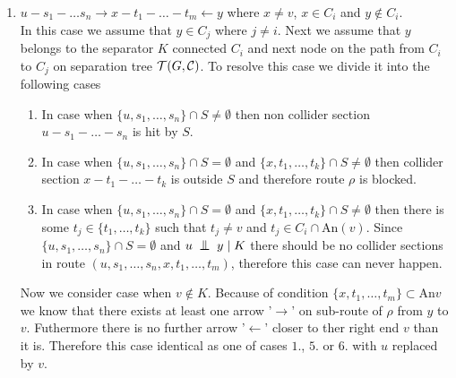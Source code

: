 \begin{prf}
\begin{enumerate}
		\item $u - s_1 - \dots s_n \rightarrow x - t_1 - \dots - t_m \leftarrow y$ where $x \neq v$, $x \in C_i$ and $y \not\in C_i$. \\ 
			In this case we assume that $y \in C_j$ where $j \neq i$. Next we assume that $y$ belongs to the separator $K$ 
			connected  $C_i$ and next node on the path from $C_i$ to $C_j$ on separation tree $\mathcal{T}(G, \mathcal{C})$. To resolve this
			case we divide it into the following cases

			\begin{enumerate}
				\item In case when $\{u, s_1, \dots, s_n \} \cap S \neq \emptyset$ then non collider section $u - s_1 - \dots - s_n$ is hit by $S$.

				\item In case when $\{u, s_1, \dots, s_n \} \cap S = \emptyset$ and $\{x, t_1, \dots, t_k \} \cap S \neq \emptyset$ then 
					collider section $x - t_1 - \dots - t_k$ is outside $S$ and therefore route $\rho$ is blocked.

				\item In case when $\{u, s_1, \dots, s_n \} \cap S = \emptyset$ and $\{x, t_1, \dots, t_k \} \cap S \neq \emptyset$ then
					there is some $t_j \in \{ t_1, \dots, t_k \}$ such that $t_j \neq v$ and $t_j \in C_i \cap \mbox{An}(v)$. 
				 	Since $\{ u, s_1, \dots, s_n \} \cap S = \emptyset$ and $u \bigCI y \mid K$ there should be no 
					collider sections in route $(u, s_1, \dots, s_n, x, t_1, \dots, t_m)$, therefore this case can never happen.
			\end{enumerate}

			Now we consider case when $v \not\in K$. Because of condition $\{ x, t_1, \dots, t_m \} \subset \mbox{An}{v}$ we know that
			there exists at least one arrow '$\rightarrow$' on sub-route of $\rho$ from $y$ to $v$. Futhermore there is no further arrow '$\leftarrow$' 
			closer to ther right end $v$ than it is. Therefore this case identical as one of cases $1.$, $5.$ or $6.$ with $u$ replaced by $v$.


\end{enumerate}
\end{prf}
